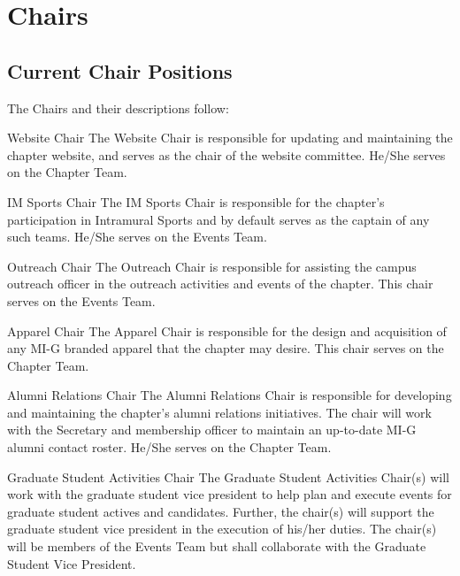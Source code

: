 
\chapter{Chairs}\label{sec:Chairs} 
\section{Current Chair Positions} The Chairs and their descriptions follow:\\
\begin{enumsubsection}
\item{Website Chair} The Website Chair is responsible for updating and maintaining the chapter website, and serves as the chair of the website committee. He/She serves on the Chapter Team.
\item{IM Sports Chair} The IM Sports Chair is responsible for the chapter's participation in Intramural Sports and by default serves as the captain of any such teams. He/She serves on the Events Team.
\item{Outreach Chair} The Outreach Chair is responsible for assisting the
campus outreach officer in the outreach activities and events of the chapter. This chair serves on the Events Team.
\item{Apparel Chair} The Apparel Chair is responsible for the design and acquisition of any MI-G branded apparel that the chapter may desire. This chair serves on the Chapter Team.
\item{Alumni Relations Chair} The Alumni Relations Chair is responsible for developing and maintaining the chapter's alumni relations initiatives. The chair will work with the Secretary and membership officer to maintain an up-to-date MI-G alumni contact roster. He/She serves on the Chapter Team.
\item{Graduate Student Activities Chair} The Graduate Student Activities Chair(s) will work with the graduate student vice president to help plan and execute events for graduate student actives and candidates. Further, the chair(s) will support the graduate student vice president in the execution of his/her duties. The chair(s) will be members of the Events Team but shall collaborate with the Graduate Student Vice President.


\end{enumsubsection}
